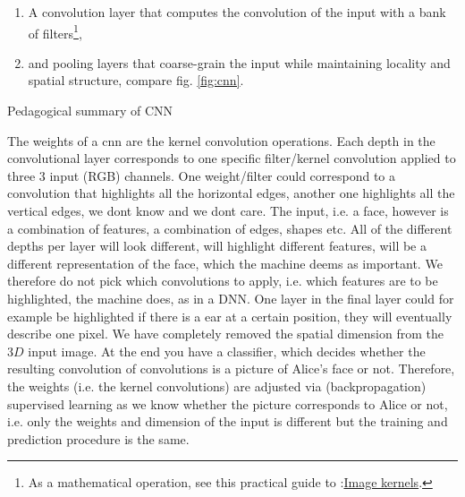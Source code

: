 \begin{enumerate}
\item A convolution layer that computes the convolution of the input with a bank of filters\footnote{As a mathematical operation, see this practical guide to :\href{http://setosa.io/ev/image-kernels}{Image kernels}.},
\item and pooling layers that coarse-grain the input while maintaining locality and spatial structure, compare fig. \ref{fig:cnn}.
\end{enumerate}
\begin{mybox}{Pedagogical summary of CNN}
	
	The weights of a cnn are the kernel convolution operations. Each depth in the convolutional layer corresponds to one specific filter/kernel convolution applied to three $3$ input (RGB) channels. One weight/filter could correspond to a convolution that highlights all the horizontal edges, another one highlights all the vertical edges, we dont know and we dont care. The input, i.e. a face, however is a combination of features, a combination of edges, shapes etc. All of the different depths per layer will look different, will highlight different features, will be a different representation of the face, which the machine deems as important. We therefore do not pick which convolutions to apply, i.e. which features are to be highlighted, the machine does, as in a DNN. One layer in the final layer could for example be highlighted if there is a ear at a certain position, they will eventually describe one pixel. We have completely removed the spatial dimension from the $3D$ input image. At the end you have a classifier, which decides whether the resulting convolution of convolutions is a picture of Alice's face or not. Therefore, the weights (i.e. the kernel convolutions) are adjusted via (backpropagation) supervised learning as we know whether the picture corresponds to Alice or not, i.e. only the weights and dimension of the input is different but the training and prediction procedure is the same.
\end{mybox}

